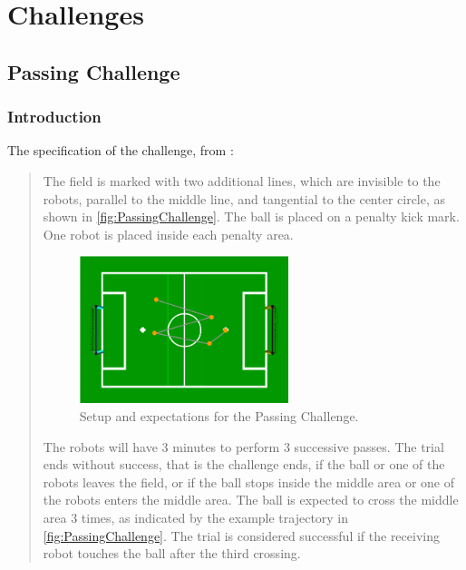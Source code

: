 \documentclass[pdftex,11pt,a4paper]{report}
\begin{document}
\chapter{Challenges}

\section{Passing Challenge}
\subsection{Introduction}
The specification of the challenge, from \cite{ChallengeRules}:

\begin{quotation}
   The field is marked with two additional lines, which are invisible to the
   robots, parallel to the middle line, and tangential to the center circle,
   as shown in \autoref{fig:PassingChallenge}.  The ball is placed on a
   penalty kick mark. One robot is placed inside each penalty area.

   \begin{figure}[ht]
      \begin{center}
         \includegraphics[width=0.6\textwidth]{figures/passing_challenge}
      \end{center}
      \caption{Setup and expectations for the Passing Challenge.}
      \label{fig:PassingChallenge}
   \end{figure}

   The robots will have 3 minutes to perform 3 successive passes. The trial
   ends without success, that is the challenge ends, if the ball or one of the
   robots leaves the field, or if the ball stops inside the middle area or one
   of the robots enters the middle area. The ball is expected to cross the
   middle area 3 times, as indicated by the example trajectory in 
   \autoref{fig:PassingChallenge}. The trial is considered successful if the
   receiving robot touches the ball after the third crossing.
\end{quotation}
\end{document}
